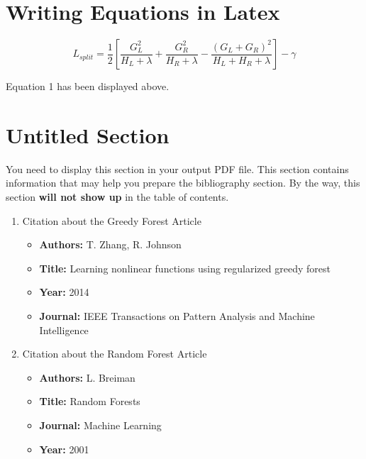 \documentclass[11pt]{article}
\begin{document}
    \pagebreak
    \section{Writing Equations in Latex}
    \begin{equation}[h]
        L_{split} = \frac{1}{2}\left[ \frac{G_L^2}{H_L+\lambda} +  \frac{G_R^2}{H_R+\lambda} -  \frac{(G_L+G_R)^2}{H_L+ H_R+\lambda} \right] - \gamma
    \end{equation}

    Equation 1 has been displayed above.\cite{ML}

    \section*{Untitled Section}
    You need to display this section in your output PDF file. This section contains information
    that may help you prepare the bibliography section. By the way, this section \textbf{will not show up} in the table of contents.

    \begin{enumerate}
        \item  Citation about the Greedy Forest Article
        \begin{itemize}
            \item \textbf{ Authors:} T. Zhang, R. Johnson
            \item \textbf{ Title:}  Learning nonlinear functions using regularized greedy forest
            \item \textbf{ Year:} 2014
            \item \textbf{ Journal:}  IEEE Transactions on Pattern Analysis and Machine Intelligence
            
        \end{itemize}
        \item Citation about the Random Forest Article
        \begin{itemize}
            \item \textbf{ Authors:}  L. Breiman
            \item \textbf{ Title:}  Random Forests
            \item \textbf{ Journal:}   Machine Learning
            \item \textbf{ Year:} 2001
        \end{itemize}
    \end{enumerate}

    
    
    
\end{document}
